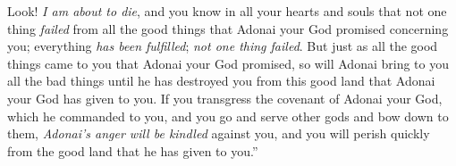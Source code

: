 \begin{biblechapter}
\verse Look! \textit{I am about to die}, and you know in all your hearts and souls that not one thing \textit{failed} from all the good things that Adonai your God promised concerning you; everything \textit{has been fulfilled}; \textit{not one thing failed}.
\verse But just as all the good things came to you that Adonai your God promised, so will Adonai bring to you all the bad things until he has destroyed you from this good land that Adonai your God has given to you.
\verse If you transgress the covenant of Adonai your God, which he commanded to you, and you go and serve other gods and bow down to them, \textit{Adonai’s anger will be kindled} against you, and you will perish quickly from the good land that he has given to you.”
\end{biblechapter}


